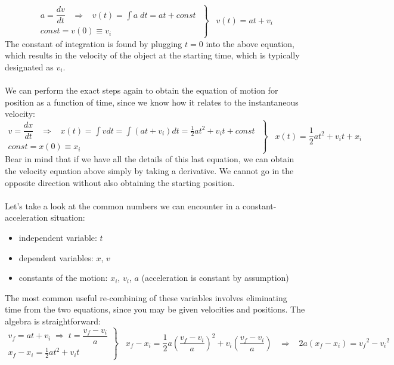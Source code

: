 \documentclass[12pt,addpoints]{exam}
\begin{document}
	$$\left. \begin{array}{l} a = \dfrac{dv}{dt}\;\;\; \Rightarrow \;\;\;v\left( t \right) = \int {a\;dt} = at + const \;\\ const = v\left( 0 \right) \equiv {v_i} \end{array} \right\}\;\;\;v\left( t \right) = at + {v_i}$$
	The constant of integration is found by plugging  $t=0$
	into the above equation, which results in the velocity of the object at the starting time, which is typically designated as $v_i$. \\ \\
	We can perform the exact steps again to obtain the equation of motion for position as a function of time, since we know how it relates to the instantaneous velocity:
	$$\left. \begin{array}{l} v = \dfrac{dx}{dt}\;\;\; \Rightarrow \;\;\;x\left( t \right) = \int {vdt} = \int {\left( {at + {v_i}} \right)dt} = \frac{1}{2}a{t^2} + {v_i}t + const \;\\ const = x\left( 0 \right) \equiv {x_i} \end{array} \right\}\;\;\;x\left( t \right) = \frac{1}{2}a{t^2} + {v_i}t + {x_i}$$
	Bear in mind that if we have all the details of this last equation, we can obtain the velocity equation above simply by taking a derivative. We cannot go in the opposite direction without also obtaining the starting position. \\ \\
	Let’s take a look at the common numbers we can encounter in a constant-acceleration situation:
	\begin{itemize}
		\item independent variable: $t$
		\item dependent variables:  $x$, $v$
		\item constants of the motion:  $x_i$, $v_i$, $a$ (acceleration is constant by assumption)
	\end{itemize}
	The most common useful re-combining of these variables involves eliminating time from the two equations, since you may be given velocities and positions. The algebra is straightforward:
	$$\left. \begin{array}{l} v_f = at + v_i \;\Rightarrow \;t = \dfrac{v_f - v_i}{a}\\ x_f - x_i = \frac{1}{2}a{t^2} + {v_i}t \end{array} \right\} \;\;\; x_f - x_i = \frac{1}{2}a \left( \dfrac{v_f - v_i}{a} \right)^2 + v_i \left( \dfrac{v_f - v_i}{a} \right) \;\;\;\Rightarrow \;\;\; 2a \left( x_f - x_i \right) = {v_f}^2 - {v_i}^2$$
\end{document}
